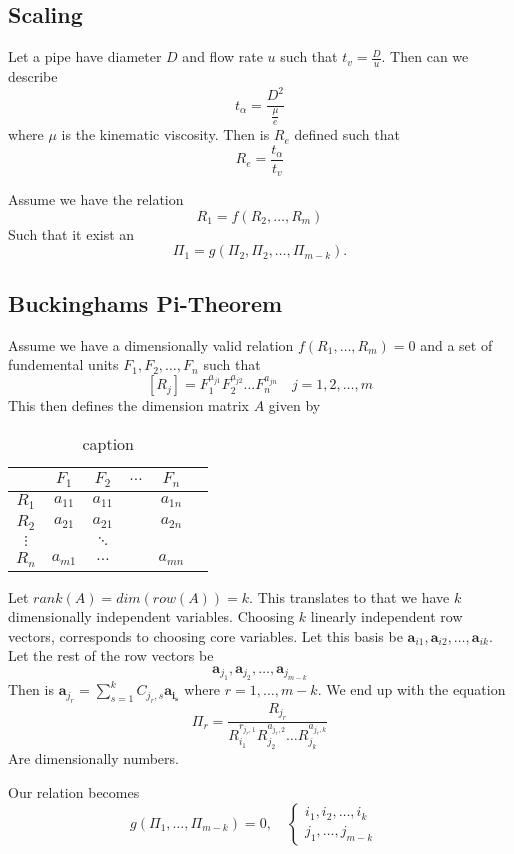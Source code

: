 \documentclass{article}
\theoremstyle{remark}
\begin{document}
\subsection{Scaling}%
\label{sub:scaling_2}

Let a pipe have diameter $D$ and flow rate $u$ such that $ t_{v} = \frac{D}{ u} $. Then can we describe \[
t_{\alpha } =  \frac{D^{2}}{ \frac{ \mu }{e} } 
\] 
where $\mu $ is the kinematic viscosity. Then is $R_{e} $ defined such that \[
R_{e} = \frac{t_{\alpha }}{ t_{v}} 
\]
\par
Assume we have the relation \[
R_{1} = f\left( R_{2}, \ldots, R_{m} \right)
\] 
Such that it exist an \[
\Pi _{1} = g\left( \Pi _{2}, \Pi _{2} , \ldots, \Pi _{m-k}  \right).
\] 
\subsection{Buckinghams Pi-Theorem}%
\label{sub:buckinghams_pi_theorem}

Assume we have a dimensionally valid relation $f\left( R_{1}, \ldots, R_{m} \right) = 0$ and a set of fundemental units $F_{1}, F_{2}, \ldots, F_{n}$ such that \[
\left[ R_{j} \right] = F_{1} ^{a_{j1}} F_{2} ^{a_{j2}} \ldots F_{n}^{a_{jn} } \quad  j = 1,2, \ldots, m 
\] 
This then defines the dimension matrix $A$ given by 

\begin{table}[htpb]
  \centering
  \caption{caption}
  \label{tab:label}
  \begin{tabular}{c | c c c c c}
  &  $F_{1}$ & $F_{2}$ & $\ldots$  & $F_{n}$ & \\ \hline
  $R_1$ &$a_{11}$  &$a_{11}$  &     & $a_{1n}$ &  \\
  $R_2$ &$a_{21}$  &$a_{21}$  &     &  $a_{2n}$ &  \\
  $\vdots$  &  & $\ddots$   &  &  \\
  $R_n$ &  $a_{m1}$ & $\ldots$   &  &  $a_{mn}$&
  \end{tabular}
\end{table}


Let $rank\left( A \right) = dim \left( row\left( A \right) \right) = k$. This translates to that we have $k$ dimensionally  independent variables. Choosing $k$ linearly independent row vectors, corresponds to choosing core variables. Let this basis be $\mathbf{a}_{i1}, \mathbf{a}_{i2}, \ldots , \mathbf{a}_{ik}$. Let the rest of the row vectors be \[
\mathbf{a}_{j_{1}} , \mathbf{a}_{j_{2}}, \ldots, \mathbf{a}_{j_{m-k}}
\] 
Then is $\mathbf{a}_{j_{r}} =  \sum_{s=1}^{k} C _{j_{r}, s} \mathbf{a_{i_{s}}}  $ where $r=  1, \ldots, m-k$. We end up with the equation \[
  \Pi _{r} = \frac{R_{j_{r}}}{ R_{i_{1}} ^{ r_{j_{r}, 1}} R_{j_{2}}^{a_{j_{r}, 2}} \ldots R_{j_{k}} ^{ a_{j_{r}, k}} } 
\] 
Are dimensionally numbers. \par Our relation becomes \[
g\left( \Pi _{1} , \ldots, \Pi _{m-k} \right) = 0, \quad \begin{cases}
  i_{1}, i_{2} , \ldots, i_{k}  &  \\
  j_{1} , \ldots, j_{m-k}
\end{cases} 
\] 
\end{document}
